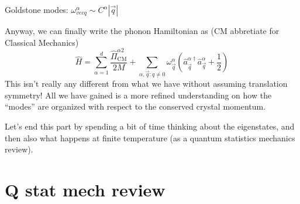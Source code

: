 Goldstone modes: $\omega_{vec{q}}^\alpha\sim C^\alpha |\vec{q}|$

Anyway, we can finally write the phonon Hamiltonian as (CM abbretiate for Classical Mechanics)
\[ \hat{H}=\sum_{\alpha =1}^d{\frac{\hat{\Pi}_{\mathrm{CM}}^{\alpha 2}}{2M}}+\sum_{\alpha ,\vec{q}:q\ne 0}{\omega _{\vec{q}}^{\alpha}\left( \hat{a}_{\vec{q}}^{\alpha \dagger}\hat{a}_{\vec{q}}^{\alpha}+\frac{1}{2} \right)}\]
This isn't really any different from what we have without assuming translation symmetry! All we have gained is a more refined understanding on how the ``modes'' are organized with respect to the conserved crystal momentum.

Let's end this part by spending a bit of time thinking about the eigenstates, and then also what happens at finite temperature (as a quantum statistics mechanics review).

\section{Q stat mech review}

